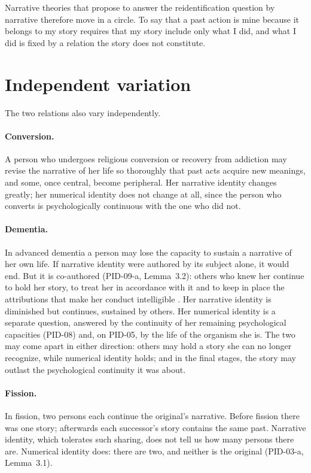 \documentclass{situationist-preprint}
\begin{document}
Narrative theories that propose to answer the reidentification question by narrative therefore move in a circle. To say that a past action is mine because it belongs to my story requires that my story include only what I did, and what I did is fixed by a relation the story does not constitute.

\section{Independent variation}

The two relations also vary independently.

\paragraph{Conversion.} A person who undergoes religious conversion or recovery from addiction may revise the narrative of her life so thoroughly that past acts acquire new meanings, and some, once central, become peripheral. Her narrative identity changes greatly; her numerical identity does not change at all, since the person who converts is psychologically continuous with the one who did not.

\paragraph{Dementia.} In advanced dementia a person may lose the capacity to sustain a narrative of her own life. If narrative identity were authored by its subject alone, it would end. But it is co-authored (PID-09-a, Lemma~3.2): others who knew her continue to hold her story, to treat her in accordance with it and to keep in place the attributions that make her conduct intelligible \citep{Lindemann2014}. Her narrative identity is diminished but continues, sustained by others. Her numerical identity is a separate question, answered by the continuity of her remaining psychological capacities (PID-08) and, on PID-05, by the life of the organism she is. The two may come apart in either direction: others may hold a story she can no longer recognize, while numerical identity holds; and in the final stages, the story may outlast the psychological continuity it was about.

\paragraph{Fission.} In fission, two persons each continue the original's narrative. Before fission there was one story; afterwards each successor's story contains the same past. Narrative identity, which tolerates such sharing, does not tell us how many persons there are. Numerical identity does: there are two, and neither is the original (PID-03-a, Lemma~3.1).
\end{document}
